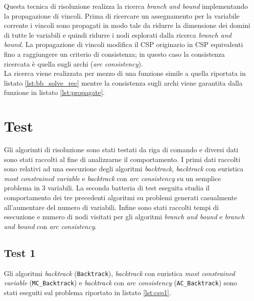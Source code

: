 \documentclass[10pt, a4paper]{article}
\begin{document}
Questa tecnica di risoluzione realizza la ricerca \textit{branch and bound} implementando la propagazione di vincoli. Prima di ricercare un assegnamento per la variabile corrente i vincoli sono propagati in modo tale da ridurre la dimensione dei domini di tutte le variabili e quindi ridurre i nodi esplorati dalla ricerca \textit{branch and bound}. La propagazione di vincoli modifica il CSP originario in CSP equivalenti fino a raggiungere un criterio di consistenza; in questo caso la consistenza ricercata è quella sugli archi (\textit{arc consistency}).\\
La ricerca viene realizzata per mezzo di una funzione simile a quella riportata in listato \ref{lst:bb_solve_rec} mentre la consistenza sugli archi viene garantita dalla funzione in listato \ref{lst:propagate}.


\section{Test}\label{sec:test}

Gli algorimti di risoluzione sono stati testati da riga di comando e diversi dati sono stati raccolti al fine di analizzarne il comportamento. I primi dati raccolti sono relativi ad una esecuzione degli algoritmi \textit{backtrack}, \textit{backtrack} con euristica \textit{most constrained variable} e \textit{backtrack} con \textit{arc consistency} su un semplice problema in 3 variabili. La seconda batteria di test eseguita studia il comportamento dei tre precedenti algoritmi su problemi generati casualmente all'aumentare del numero di variabili. Infine sono stati raccolti tempi di esecuzione e numero di nodi visitati per gli algoritmi \textit{branch and bound} e \textit{branch and bound} con \textit{arc consistency}.

\subsection{Test 1}
Gli algoritmi \textit{backtrack} (\texttt{Backtrack}), \textit{backtrack} con euristica \textit{most constrained variable} (\texttt{MC\_Backtrack}) e \textit{backtrack} con \textit{arc consistency} (\texttt{AC\_Backtrack}) sono stati eseguiti sul problema riportato in listato \ref{lst:csp1}.
\end{document}
